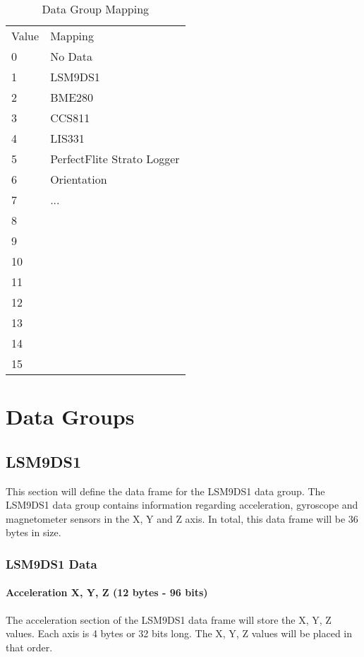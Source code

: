 \documentclass{article}
\begin{document}
  \begin{table}[h]
  \centering
  \caption{Data Group Mapping}
  \begin{tabular}{ll}
  Value & Mapping \\
  0     & No Data \\
  1     & LSM9DS1     \\
  2     & BME280        \\
  3     & CCS811        \\
  4     & LIS331      \\
  5     & PerfectFlite Strato Logger       \\
  6     & Orientation   \\
  7     &  ...       \\
  8     &         \\
  9     &         \\
  10    &         \\
  11    &         \\
  12    &         \\
  13    &         \\
  14    &         \\
  15    &        
  \end{tabular}
  \end{table}
  
  \pagebreak
  
  \section{Data Groups}
  \subsection{LSM9DS1}
  This section will define the data frame for the LSM9DS1 data group. The LSM9DS1 data group contains information regarding acceleration, gyroscope and magnetometer sensors in the X, Y and Z axis. In total, this data frame will be 36 bytes in size. 
  \subsubsection{LSM9DS1 Data}
  \paragraph{Acceleration X, Y, Z (12 bytes - 96 bits)}
  The acceleration section of the LSM9DS1 data frame will store the X, Y, Z values. Each axis is 4 bytes or 32 bits long. The X, Y, Z values will be placed in that order.
\end{document}
